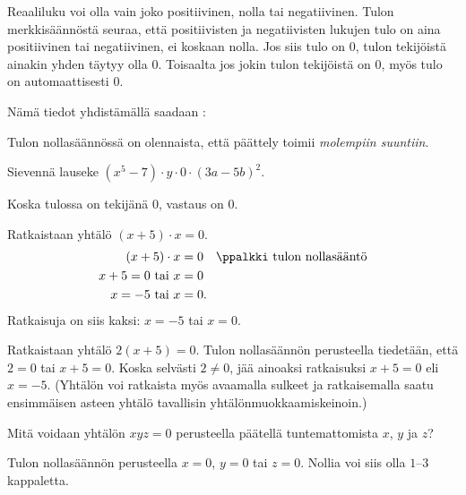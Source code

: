 Reaaliluku voi olla vain joko positiivinen, nolla tai negatiivinen. Tulon merkkisäännöstä seuraa, että positiivisten ja negatiivisten lukujen tulo on aina positiivinen tai negatiivinen, ei koskaan nolla. Jos siis tulo on $0$, tulon tekijöistä ainakin yhden täytyy olla $0$. Toisaalta jos jokin tulon tekijöistä on $0$, myös tulo on automaattisesti $0$.

Nämä tiedot yhdistämällä saadaan :


Tulon nollasäännössä on olennaista, että päättely toimii \emph{molempiin suuntiin}.

\begin{esimerkki}
Sievennä lauseke $(x^5-7)\cdot y \cdot 0\cdot(3a-5b)^2$.
    \begin{esimratk}
Koska tulossa on tekijänä $0$, vastaus on $0$.
    \end{esimratk}
\end{esimerkki}

\begin{esimerkki} Ratkaistaan yhtälö $(x+5) \cdot x =0 $.
    \begin{align*}
        (x+5)\cdot x &=0 \quad \ppalkki \text{ tulon nollasääntö} \\
        x +5= 0 \text{ tai } x &=0 \\
        x= -5 \text{ tai } x &=0.
    \end{align*}
    Ratkaisuja on siis kaksi: $x= -5$ tai $x= 0$.
\end{esimerkki}

\begin{esimerkki} Ratkaistaan yhtälö $2(x+5)=0$. Tulon nollasäännön perusteella tiedetään, että $2=0$ tai $x+5=0$. Koska selvästi $2\neq 0$, jää ainoaksi ratkaisuksi $x+5=0$ eli $x=-5$. (Yhtälön voi ratkaista myös avaamalla sulkeet ja ratkaisemalla saatu ensimmäisen asteen yhtälö tavallisin yhtälönmuokkaamiskeinoin.)
\end{esimerkki}

\begin{esimerkki} Mitä voidaan yhtälön $xyz=0$ perusteella päätellä tuntemattomista $x$, $y$ ja $z$?
	\begin{esimratk}
Tulon nollasäännön perusteella $x=0$, $y=0$ tai $z=0$. Nollia voi siis olla $1$--$3$ kappaletta.
	\end{esimratk}
\end{esimerkki}

